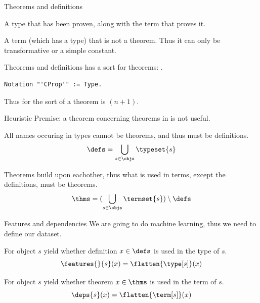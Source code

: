 \documentclass[department=ds, notes={hide notes}, slidesperpage=1]{beamerruhuisstijl}
\begin{document}
\begin{frame}{Theorems and definitions}
	\begin{definition}[Theorem]
		A type that has been proven, along with the term that proves it.
	\end{definition}
	\bigskip
	\begin{definition}[Definition]
		A term (which has a type) that is not a theorem.
		Thus it can only be transformative or a simple constant.
	\end{definition}
\end{frame}

\begin{frame}[fragile]{Theorems and definitions}
	\coq has a sort for theorems: \sortprop.
	\pause
	\bigskip
\begin{lstlisting}[language=Coq, mathescape]
Notation "'CProp'" := Type.
\end{lstlisting}
	\bigskip
	Thus for \corn the sort of a theorem is \sorttype{}$(n+1)$.
\end{frame}

\begin{frame}{Heuristic}
	Premise: a theorem concerning theorems in \coq is not useful.
	\bigskip
	\begin{definition}[$\defs$]
		All names occuring in types cannot be theorems, and thus must be definitions.
		\[ \defs = \bigcup_{s \in \objs} \typeset{s} \]
	\end{definition}
	\bigskip
	\begin{definition}[$\thms$]
		Theorems build upon eachother, thus what is used in terms, except the definitions, must be theorems.
		\[ \thms = (\bigcup_{s \in \objs} \termset{s}) \setminus \defs \]
	\end{definition}
\end{frame}

\begin{frame}{Features and dependencies}
	We are going to do machine learning, thus we need to define our dataset.
	\bigskip
	\begin{definition}[Features]
		For object $s$ yield whether definition $x \in \defs$ is used in the type of $s$.
		\[ \features{}{s}(x) = \flatten{\type[s]}(x) \]
	\end{definition}
	\bigskip
	\begin{definition}[Dependencies]
		For object $s$ yield whether theorem $x \in \thms$ is used in the term of $s$.
		\[ \deps{s}(x) = \flatten{\term[s]}(x) \]
	\end{definition}
\end{frame}
\end{document}
